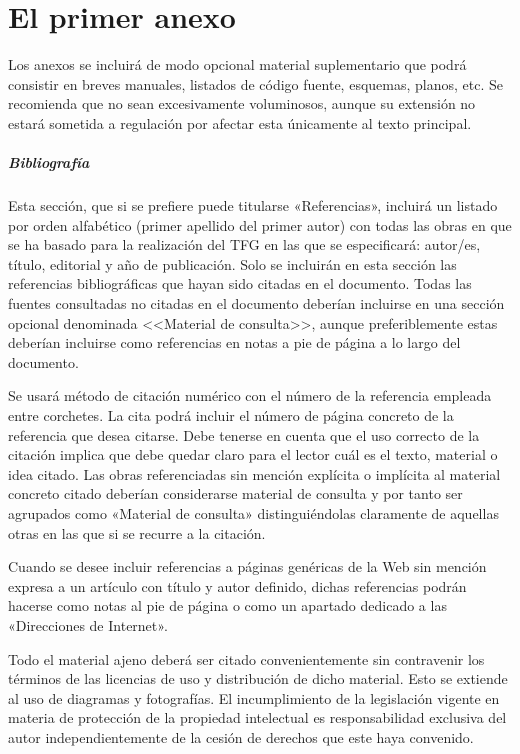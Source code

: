 \chapter{El primer anexo}
\label{cap:AnexoA}

Los anexos se incluirá de modo opcional material suplementario que podrá consistir en breves manuales, listados de código fuente, esquemas, planos, etc. Se recomienda que no sean excesivamente voluminosos, aunque su extensión no estará sometida a regulación por afectar esta únicamente al texto principal. 

\paragraph{Bibliografía}
Esta sección, que si se prefiere puede titularse 
«Referencias», incluirá un listado por orden alfabético 
(primer apellido del primer autor) con todas las obras en que se ha basado 
para la realización del TFG en las que se especificará: autor/es, 
título, editorial y año de publicación. Solo se incluirán en esta sección las 
referencias bibliográficas que hayan sido citadas en el documento. Todas las 
fuentes consultadas no citadas en el documento deberían incluirse en una 
sección opcional denominada <<Material de consulta>>, aunque preferiblemente 
estas deberían incluirse como referencias en notas a pie de página a lo largo 
del documento.

Se usará método de citación numérico con el número de la referencia empleada entre corchetes. La cita podrá incluir el número de página concreto de la referencia que desea citarse. Debe tenerse en cuenta que el uso correcto de la citación implica que debe quedar claro para el lector cuál es el texto, material o idea citado. Las obras referenciadas sin mención explícita o implícita al material concreto citado deberían considerarse material de consulta y por tanto ser agrupados como «Material de consulta» distinguiéndolas claramente de aquellas otras en las que si se recurre a la citación.

Cuando se desee incluir referencias a páginas genéricas de la Web sin mención expresa a un artículo con título y autor definido, dichas referencias podrán hacerse como notas al pie de página o como un apartado dedicado a las «Direcciones de Internet».

Todo el material ajeno deberá ser citado convenientemente sin contravenir los términos de las licencias de uso y distribución de dicho material. Esto se extiende al uso de diagramas y fotografías. El incumplimiento de la legislación vigente en materia de protección de la propiedad intelectual es responsabilidad exclusiva del autor independientemente de la cesión de derechos que este haya convenido.

